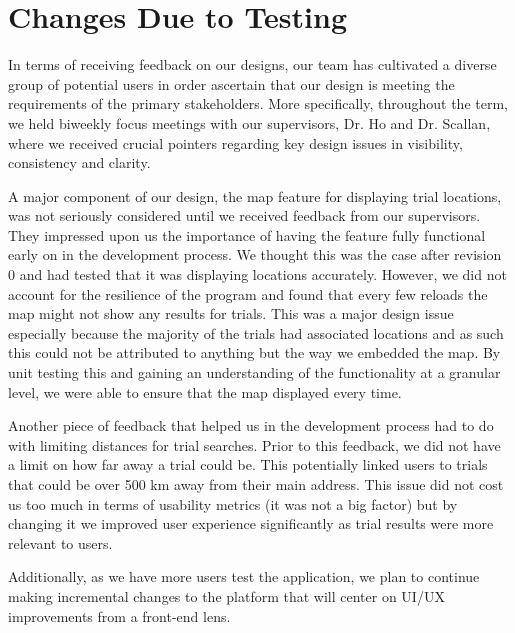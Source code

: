 \documentclass[12pt, titlepage]{article}
\begin{document}
\section{Changes Due to Testing}

In terms of receiving feedback on our designs, our team has cultivated a diverse group of potential users 
in order ascertain that our design is meeting the requirements of the primary stakeholders. 
More specifically, throughout the term, 
we held biweekly focus meetings with our supervisors, Dr. Ho and Dr. Scallan, where we received crucial 
pointers regarding key design issues in visibility, consistency and clarity. \newline

A major component of our design, the map feature for displaying trial locations, 
was not seriously considered until we received feedback from our supervisors. They impressed upon
us the importance of having the feature fully functional early on in the development process.
We thought this was the case after revision 0 and had tested that it was displaying locations
accurately. However, we did not account for the resilience of the program and found that every few reloads
the map might not show any results for trials. This was a major design issue
especially because the majority of the trials had associated locations and as such this could not be
attributed to anything but the way we embedded the map.  
By unit testing this and gaining an understanding of the functionality at a granular level, 
we were able to ensure that the map displayed every time. \newline 

Another piece of feedback that helped us in the development process
had to do with limiting distances for trial searches. Prior to this feedback, 
we did not have a limit on how far away a trial could be. This potentially linked 
users to trials that could be over 500 km away from their main address. This issue did not 
cost us too much in terms of usability metrics (it was not a big factor) but by changing it
we improved user experience significantly as trial results were more relevant to users. \newline

Additionally, as we have more users test the application, we plan to continue making incremental changes 
to the platform that will center on UI/UX improvements from a front-end lens. 
\end{document}

